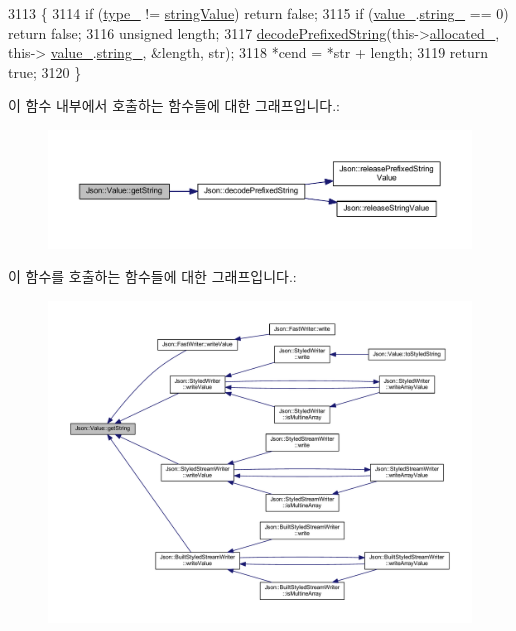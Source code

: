 \begin{DoxyCode}
3113                                                                \{
3114   \textcolor{keywordflow}{if} (\hyperlink{class_json_1_1_value_abd222c2536dc88bf330dedcd076d2356}{type\_} != \hyperlink{namespace_json_a7d654b75c16a57007925868e38212b4ea804ef857affea2d415843c73f261c258}{stringValue}) \textcolor{keywordflow}{return} \textcolor{keyword}{false};
3115   \textcolor{keywordflow}{if} (\hyperlink{class_json_1_1_value_aef578244546212705b9f81eb84d7e151}{value\_}.\hyperlink{union_json_1_1_value_1_1_value_holder_a70ac2b153bc405527baa3850d2ddc3cb}{string\_} == 0) \textcolor{keywordflow}{return} \textcolor{keyword}{false};
3116   \textcolor{keywordtype}{unsigned} length;
3117   \hyperlink{namespace_json_aad8b4982c1acd164f541fba396ac9fb1}{decodePrefixedString}(this->\hyperlink{class_json_1_1_value_ae0126c80dc4907aad94088553fc7632b}{allocated\_}, this->
      \hyperlink{class_json_1_1_value_aef578244546212705b9f81eb84d7e151}{value\_}.\hyperlink{union_json_1_1_value_1_1_value_holder_a70ac2b153bc405527baa3850d2ddc3cb}{string\_}, &length, str);
3118   *cend = *str + length;
3119   \textcolor{keywordflow}{return} \textcolor{keyword}{true};
3120 \}
\end{DoxyCode}
이 함수 내부에서 호출하는 함수들에 대한 그래프입니다.\+:\nopagebreak
\begin{figure}[H]
\begin{center}
\leavevmode
\includegraphics[width=350pt]{class_json_1_1_value_a2e1b7be6bde2fe23f15290d9ddbbdf8a_cgraph}
\end{center}
\end{figure}
이 함수를 호출하는 함수들에 대한 그래프입니다.\+:\nopagebreak
\begin{figure}[H]
\begin{center}
\leavevmode
\includegraphics[width=350pt]{class_json_1_1_value_a2e1b7be6bde2fe23f15290d9ddbbdf8a_icgraph}
\end{center}
\end{figure}
